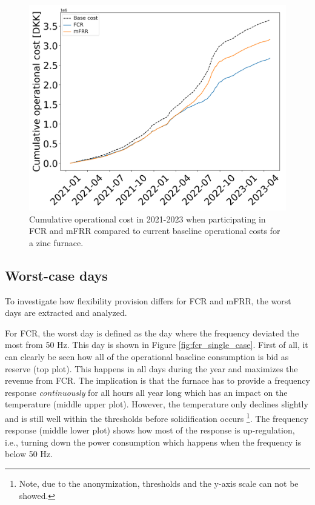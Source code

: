 \documentclass[lettersize,journal]{IEEEtran}
\begin{document}
\begin{figure}[t]
    \centering
    \includegraphics[width=\columnwidth]{figures/cumulative_cost_comparison.png}
    \caption{Cumulative operational cost in 2021-2023 when participating in FCR and mFRR compared to current baseline operational costs for a zinc furnace.}
    \label{fig:cumulative_cost_comparison}
\end{figure}

\subsection{Worst-case days}

To investigate how flexibility provision differs for FCR and mFRR, the worst days are extracted and analyzed.

For FCR, the worst day is defined as the day where the frequency deviated the most from 50 Hz. This day is shown in Figure \ref{fig:fcr_single_case}. First of all, it can clearly be seen how all of the operational baseline consumption is bid as reserve (top plot). This happens in all days during the year and maximizes the revenue from FCR. The implication is that the furnace has to provide a frequency response \textit{continuously} for all hours all year long which has an impact on the temperature (middle upper plot). However, the temperature only declines slightly and is still well within the thresholds before solidification occurs \footnote{Note, due to the anonymization, thresholds and the y-axis scale can not be showed.}. The frequency response (middle lower plot) shows how most of the response is up-regulation, i.e., turning down the power consumption which happens when the frequency is below 50 Hz.
\end{document}
